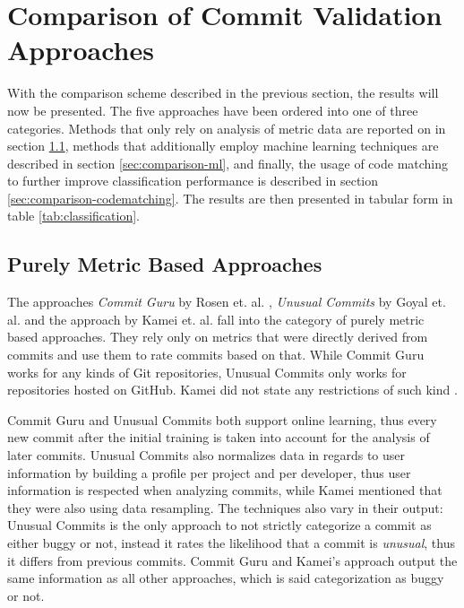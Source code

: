 \section{Comparison of Commit Validation Approaches}
\label{sec:comparison}

With the comparison scheme described in the previous section,
the results will now be presented. 
The five approaches have been ordered into one of three categories. Methods that only rely on analysis of metric data are reported on in section \ref{sec:comparison-metricbased}, methods that additionally employ machine learning techniques are described in section \ref{sec:comparison-ml}, and finally, the usage of code matching to further improve classification performance is described in section \ref{sec:comparison-codematching}.
The results are then presented in tabular form in table \ref{tab:classification}.

\subsection{Purely Metric Based Approaches}
\label{sec:comparison-metricbased}

The approaches \textit{Commit Guru} by Rosen et. al. \cite{Rosen2015}, \textit{Unusual Commits} by Goyal et. al. \cite{Goyal2017} and the approach by Kamei et. al. \cite{Kamei2013} fall into the category of purely metric based approaches. They rely only on metrics that were directly derived from commits and use them to rate commits based on that. While Commit Guru works for any kinds of Git repositories, Unusual Commits only works for repositories hosted on GitHub. Kamei did not state any restrictions of such kind \cite{Kamei2013}.

Commit Guru and Unusual Commits both support online learning, thus every new commit after the initial training is taken into account for the analysis of later commits.
Unusual Commits also normalizes data in regards to user information by building a profile per project and per developer, thus user information is respected when analyzing commits, 
while Kamei mentioned that they were also using data resampling.
The techniques also vary in their output: Unusual Commits is the only approach to not strictly categorize a commit as either buggy or not, instead it rates the likelihood that a commit is \textit{unusual}, thus it differs from previous commits. Commit Guru and Kamei's approach output the same information as all other approaches, which is said categorization as buggy or not.

